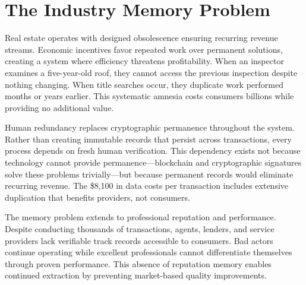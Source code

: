 \section{The Industry Memory Problem}

Real estate operates with designed obsolescence ensuring recurring revenue streams. Economic incentives favor repeated work over permanent solutions, creating a system where efficiency threatens profitability. When an inspector examines a five-year-old roof, they cannot access the previous inspection despite nothing changing. When title searches occur, they duplicate work performed months or years earlier. This systematic amnesia costs consumers billions while providing no additional value.

Human redundancy replaces cryptographic permanence throughout the system. Rather than creating immutable records that persist across transactions, every process depends on fresh human verification. This dependency exists not because technology cannot provide permanence—blockchain and cryptographic signatures solve these problems trivially—but because permanent records would eliminate recurring revenue. The \$8{,}100 in data costs per transaction includes extensive duplication that benefits providers, not consumers.

The memory problem extends to professional reputation and performance. Despite conducting thousands of transactions, agents, lenders, and service providers lack verifiable track records accessible to consumers. Bad actors continue operating while excellent professionals cannot differentiate themselves through proven performance. This absence of reputation memory enables continued extraction by preventing market-based quality improvements.

